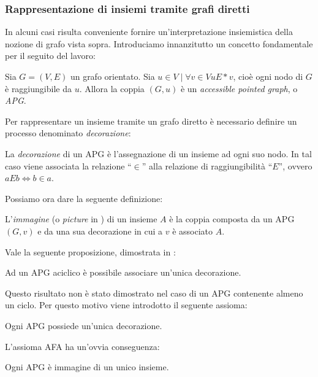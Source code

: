
\subsubsection{Rappresentazione di insiemi tramite grafi diretti}
\label{sec:graphs_sets}
In alcuni casi risulta conveniente fornire un'in\-ter\-pre\-ta\-zio\-ne insiemistica della nozione di grafo vista sopra. Introduciamo innanzitutto un concetto fondamentale per il seguito del lavoro:
\begin{definition}
    Sia $G = (V, E)$ un grafo orientato. Sia $u \in V \mid \forall v \in V u E* v$, cioè ogni nodo di $G$ è raggiungibile da $u$. Allora la coppia $(G, u)$ è un \emph{accessible pointed graph}, o \emph{APG}.
\end{definition}
Per rappresentare un insieme tramite un grafo diretto è necessario definire un processo denominato \emph{decorazione}:
\begin{definition}
    La \emph{decorazione} di un APG è l'assegnazione di un insieme ad ogni suo nodo. In tal caso viene associata la relazione ``$\in$'' alla relazione di raggiungibilità ``$E$'', ovvero $aEb \iff b \in a$.
\end{definition}
Possiamo ora dare la seguente definizione:
\begin{definition}
    L'\emph{immagine} (o \emph{picture} in \cite{aczel}) di un insieme $A$ è la coppia composta da un APG $(G,v)$ e da una sua decorazione in cui a $v$ è associato $A$.
\end{definition}
Vale la seguente proposizione, dimostrata in \cite{aczel}:
\begin{proposition}
    Ad un APG aciclico è possibile associare un'unica decorazione.
\end{proposition}
Questo risultato non è stato dimostrato nel caso di un APG contenente almeno un ciclo. Per questo motivo viene introdotto il seguente assioma:
\begin{axiom}
    Ogni APG possiede un'unica decorazione.
\end{axiom}
L'assioma AFA ha un'ovvia conseguenza:
\begin{corollary}
    Ogni APG è immagine di un unico insieme.
\end{corollary}
